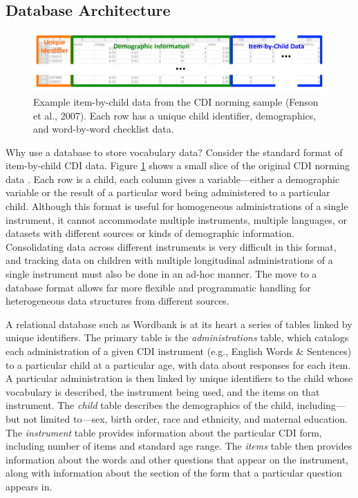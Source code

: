 \documentclass[doc,noapacite]{apa2}
\newcommand{\comment}[1]{\marginpar[]{\small \textcolor{blue}{#1}}}
\begin{document}
\subsection{Database Architecture}

\begin{figure}[t]
\centering
\includegraphics[width=5in]{figures/itembychild.pdf}
\caption{\label{fig:data} Example item-by-child data from the CDI norming sample (Fenson et al., 2007). Each row has a unique child identifier, demographics, and word-by-word checklist data. }
\end{figure}

Why use a database to store vocabulary data? Consider the standard format of item-by-child CDI data. Figure \ref{fig:data} shows a small slice of the original CDI norming data \cite{fenson1994,fenson2007}. Each row is a child, each column gives a variable---either a demographic variable or the result of a particular word being administered to a particular child. Although this format is useful for homogeneous administrations of a single instrument, it cannot accommodate multiple instruments, multiple languages, or datasets with different sources or kinds of demographic information. Consolidating data across different instruments is very difficult in this format, and tracking data on children with multiple longitudinal administrations of a single instrument must also be done in an ad-hoc manner. The move to a database format allows far more flexible and programmatic handling for heterogeneous data structures from different sources. 

A relational database such as Wordbank is at its heart a series of tables linked by unique identifiers. 
The primary table is the \emph{administrations} table, which catalogs each administration of a given CDI instrument (e.g., English Words \& Sentences) to a particular child at a particular age, with data about responses for each item. A particular administration is then linked by unique identifiers to the child whose vocabulary is described, the instrument being used, and the items on that instrument.  The \emph{child} table describes the demographics of the child, including---but not limited to---sex, birth order, race and ethnicity, and maternal education. The \emph{instrument} table provides information about the particular CDI form, including number of items and standard age range. The \emph{items} table then provides information about the words and other questions that appear on the instrument, along with information about the section of the form that a particular question appears in.
\end{document}
